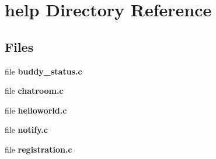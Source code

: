 \section{help Directory Reference}
\label{dir_e8e68860cefa8c743a4abfe3e508e3e2}
\subsection*{Files}
\begin{DoxyCompactItemize}
\item 
file {\bfseries buddy\-\_\-status.\-c}
\item 
file {\bfseries chatroom.\-c}
\item 
file {\bfseries helloworld.\-c}
\item 
file {\bfseries notify.\-c}
\item 
file {\bfseries registration.\-c}
\end{DoxyCompactItemize}

